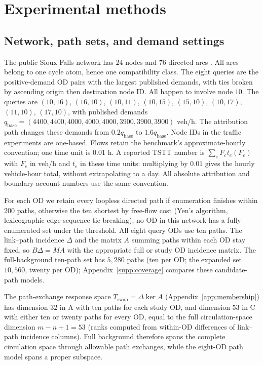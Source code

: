 \section{Experimental methods}\label{supp:fields}\label{supp:metrics}
\subsection{Network, path sets, and demand settings}\label{supp:networks}
The public Sioux Falls network has $24$ nodes and $76$ directed arcs
\citep{tnfrc2024transportation}. All arcs belong to one cycle atom, hence
one compatibility class. The eight queries are the positive-demand OD pairs with the largest
published demands, with ties broken by ascending origin then destination
node ID. All happen to involve node $10$.
The queries are
$(10,16)$, $(16,10)$, $(10,11)$, $(10,15)$, $(15,10)$, $(10,17)$, $(11,10)$, $(17,10)$,
with published demands
$q_{\mathrm{base}}=(4400,4400,4000,4000,4000,3900,3900,3900)$ veh/h.
The attribution path changes these demands from $0.2q_{\mathrm{base}}$ to
$1.6q_{\mathrm{base}}$. Node IDs in the traffic experiments are one-based.
Flows retain the benchmark's approximate-hourly convention; one time unit
is $0.01$ h. A reported TSTT number is $\sum_e F_et_e(F_e)$ with $F_e$
in veh/h and $t_e$ in these time units: multiplying by $0.01$ gives the
hourly vehicle-hour total, without extrapolating to a day. All absolute
attribution and boundary-account numbers use the same convention.

For each OD we retain every loopless directed path if enumeration finishes
within $200$ paths, otherwise the ten shortest by free-flow cost (Yen's
algorithm, lexicographic edge-sequence tie breaking); no OD in this
network has a fully enumerated set under the threshold. All eight query
ODs use ten paths. The link--path incidence $\Delta$ and the matrix $A$
summing paths within each OD stay fixed, so $B\Delta=MA$ with the
appropriate full or study OD incidence matrix. The full-background
ten-path set has $5{,}280$ paths (ten per OD; the expanded set
$10{,}560$, twenty per OD); Appendix~\ref{supp:coverage} compares these
candidate-path models.

The path-exchange response space $T_{\mathrm{swap}}=\Delta\ker A$
(Appendix~\ref{app:membership}) has dimension $32$ in A with ten
paths for each study OD, and dimension $53$ in C with either ten or
twenty paths for every OD, equal to the full circulation-space
dimension $m-n+1=53$ (ranks computed from within-OD differences of
link--path incidence columns). Full background therefore spans the
complete circulation space through allowable path exchanges, while
the eight-OD path model spans a proper subspace.

